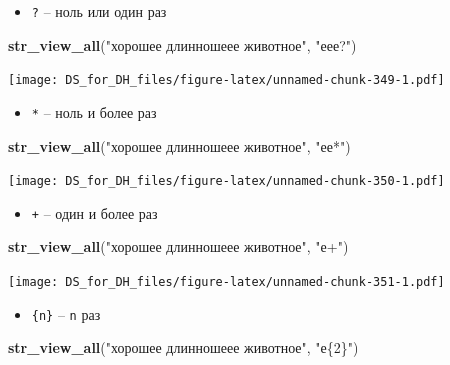 \documentclass[
]{book}
\newenvironment{Shaded}{\begin{snugshade}}{\end{snugshade}}
\newcommand{\KeywordTok}[1]{\textcolor[rgb]{0.13,0.29,0.53}{\textbf{#1}}}
\newcommand{\NormalTok}[1]{#1}
\newcommand{\StringTok}[1]{\textcolor[rgb]{0.31,0.60,0.02}{#1}}
\providecommand{\tightlist}{%
  \setlength{\itemsep}{0pt}\setlength{\parskip}{0pt}}
\begin{document}
\begin{itemize}
\tightlist
\item
  \texttt{?} -- ноль или один раз
\end{itemize}

\begin{Shaded}
\begin{Highlighting}[]
\KeywordTok{str_view_all}\NormalTok{(}\StringTok{"хорошее длинношеее животное"}\NormalTok{, }\StringTok{"еее?"}\NormalTok{)}
\end{Highlighting}
\end{Shaded}

\texttt{[image: DS\_for\_DH\_files/figure-latex/unnamed-chunk-349-1.pdf]}

\begin{itemize}
\tightlist
\item
  \texttt{*} -- ноль и более раз
\end{itemize}

\begin{Shaded}
\begin{Highlighting}[]
\KeywordTok{str_view_all}\NormalTok{(}\StringTok{"хорошее длинношеее животное"}\NormalTok{, }\StringTok{"ее*"}\NormalTok{)}
\end{Highlighting}
\end{Shaded}

\texttt{[image: DS\_for\_DH\_files/figure-latex/unnamed-chunk-350-1.pdf]}

\begin{itemize}
\tightlist
\item
  \texttt{+} -- один и более раз
\end{itemize}

\begin{Shaded}
\begin{Highlighting}[]
\KeywordTok{str_view_all}\NormalTok{(}\StringTok{"хорошее длинношеее животное"}\NormalTok{, }\StringTok{"е+"}\NormalTok{)}
\end{Highlighting}
\end{Shaded}

\texttt{[image: DS\_for\_DH\_files/figure-latex/unnamed-chunk-351-1.pdf]}

\begin{itemize}
\tightlist
\item
  \texttt{\{n\}} -- \texttt{n} раз
\end{itemize}

\begin{Shaded}
\begin{Highlighting}[]
\KeywordTok{str_view_all}\NormalTok{(}\StringTok{"хорошее длинношеее животное"}\NormalTok{, }\StringTok{"е\{2\}"}\NormalTok{)}
\end{Highlighting}
\end{Shaded}
\end{document}
